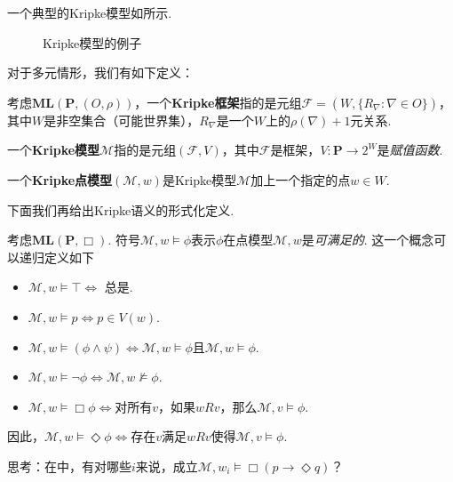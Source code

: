 一个典型的Kripke模型如所示.

\begin{figure}[ht]
    \centering
    
    \caption{Kripke模型的例子}
    \label{fig:Kripke-model-basic}
\end{figure}

对于多元情形，我们有如下定义：

\begin{definition}
    考虑$\mathbf{ML}(\mathbf{P},(O,\rho))$，一个\textbf{Kripke框架}指的是元组$\mathcal F=(W,\{R_\nabla:\nabla\in O\})$，其中$W$是非空集合（可能世界集），$R_\nabla$是一个$W$上的$\rho(\nabla)+1$元关系.

    一个\textbf{Kripke模型}$\mathcal{M}$指的是元组$(\mathcal F,V)$，其中$\mathcal F$是框架，$V:\mathbf P\to 2^W$是\emph{赋值函数}.

    一个\textbf{Kripke点模型}$(\mathcal{M},w)$是Kripke模型$\mathcal M$加上一个指定的点$w\in W$.
\end{definition}


下面我们再给出Kripke语义的形式化定义.

\begin{definition}
    考虑$\mathbf{ML}(\mathbf{P},\Box)$. 符号$\mathcal M,w\vDash\phi$表示$\phi$在点模型$\mathcal M,w$是\emph{可满足的}. 这一个概念可以递归定义如下
    \begin{itemize}
        \item $\mathcal M, w\vDash\top\iff$ 总是.
        \item $\mathcal M, w\vDash p\iff p\in V(w)$.
        \item $\mathcal M, w\vDash (\phi\wedge\psi)\iff\mathcal M,w\vDash\phi$且$\mathcal M,w\vDash\phi$.
        \item $\mathcal M, w\vDash \neg\phi\iff\mathcal M,w\not\vDash\phi$.
        \item $\mathcal M, w\vDash \Box\phi\iff$对所有$v$，如果$wRv$，那么$\mathcal M,v\vDash\phi$.
    \end{itemize}
    因此，$\mathcal M, w\vDash \Diamond\phi\iff$存在$v$满足$wRv$使得$\mathcal M,v\vDash\phi$.
\end{definition}

思考：在中，有对哪些$i$来说，成立$\mathcal M,w_i\vDash\Box (p\to\Diamond q)$？


